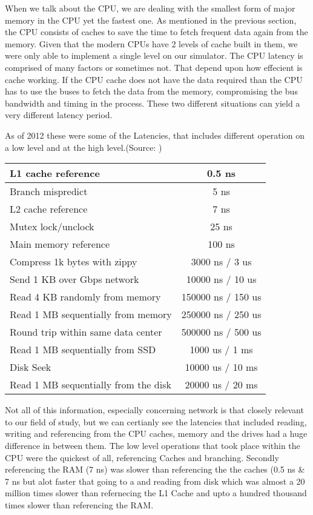 \documentclass[12pt]{article}
\begin{document}
When we talk about the CPU, we are dealing with the smallest form of major memory in the CPU yet the fastest one.
As mentioned in the previous section, the CPU consists of caches to save the time to fetch frequent data
again from the memory. Given that the modern CPUs have 2 levels of cache built in them, we were only able to
implement a single level on our simulator. The CPU latency is comprised of many factors or sometimes not. That
depend upon how effecient is cache working. If the CPU cache does not have the data required than the CPU has
to use the buses to fetch the data from the memory, compromising the bus bandwidth and timing in the process.
These two different situations can yield a very different latency period.

As of 2012 these were some of the Latencies, that includes different operation on a low level
and at the high level.(Source: \cite {Latencies})

\begin{tabular}{|l|c|}
  \hline
  L1 cache reference & 0.5 ns\\
  \hline
  Branch mispredict & 5 ns\\
  \hline
  L2 cache reference & 7 ns\\
  \hline
  Mutex lock/unclock & 25 ns\\
  \hline
  Main memory reference & 100 ns\\
  \hline
  Compress 1k bytes with zippy & 3000 ns / 3 us\\
  \hline
  Send 1 KB over Gbps network & 10000 ns / 10 us\\
  \hline
  Read 4 KB randomly from memory & 150000 ns / 150 us\\
  \hline
  Read 1 MB sequentially from memory & 250000 ns / 250 us\\
  \hline
  Round trip within same data center & 500000 ns / 500 us\\
  \hline
  Read 1 MB sequentially from SSD & 1000 us / 1 ms\\
  \hline
  Disk Seek & 10000 us / 10 ms\\
  \hline
  Read 1 MB sequentially from the disk & 20000 us / 20 ms\\ 
  \hline    
\end {tabular}

Not all of this information, especially concerning network is that closely relevant to our field of study, but
we can certianly see the latencies that included reading, writing and referencing from the CPU caches, memory
and the drives had a huge difference in between them. The low level operations that took place within the
CPU were the quickest of all, referencing Caches and branching. Secondly referencing the RAM (7 ns) was slower than
referencing the the caches (0.5 ns & 7 ns but alot faster that going to a and reading from disk which was almost a
20 million times slower than refernecing the L1 Cache and upto a hundred thousand times slower than referencing
the RAM. 
\end{document}
